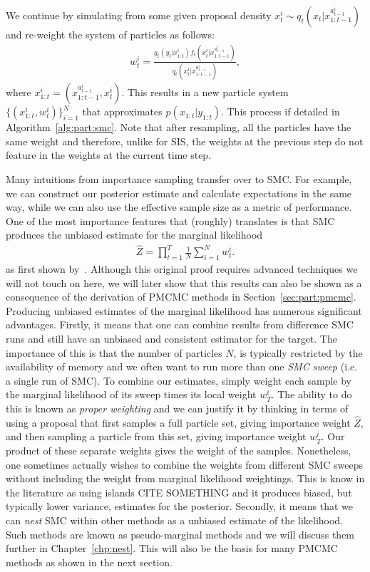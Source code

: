 We continue by simulating from some given proposal density $x_t^i \sim q_t(x_t | x_{1:t-1}^{a_{t-1}^i})$ and 
re-weight the system of particles as follows:
\begin{align}
\label{eq:smcweights}
w_t^i = \frac{g_t(y_t|x_{1:t}^i) f_t(x_t^i | x_{1:t-1}^{a_{t-1}^i})}{q_t(x_t^i|x_{1:t-1}^{a_{t-1}^i})},
\end{align}
where $x_{1:t}^i = (x_{1:t-1}^{a_{t-1}^i},x_t^i)$. This results in a new particle system $\{(x_{1:t}^i,w_t^i)\}_{i=1}^N$ that approximates $p(x_{1:t}|y_{1:t})$. This process if detailed in Algorithm~\ref{alg:part:smc}.  Note that after resampling,
all the particles have the same weight and therefore, unlike for SIS, the weights at the previous step
do not feature in the weights at the current time step.

Many intuitions from importance sampling transfer over to SMC.  For example, we can construct our posterior
estimate and calculate expectations in the same way, while we can also use the effective sample size as
a metric of performance.  One of the most importance features that (roughly) translates is that SMC produces the
unbiased estimate for the marginal likelihood 
\begin{align}
\label{eq:part:ML}
\hat Z = \prod_{t=1}^T \frac{1}{N} \sum_{i=1}^N w_{t}^{i}.
\end{align}
as first shown by~\cite{del2004feynman}.  Although this original
proof requires advanced techniques we will not touch on here, we will later show that this results can also be shown
as a consequence of the derivation of PMCMC methods in Section~\ref{sec:part:pmcmc}.  Producing unbiased
estimates of the marginal likelihood has numerous significant advantages.  Firstly, it means that one can combine
results from difference SMC runs and still have an unbiased and consistent estimator for the target.  
The importance of this is that the number of particles $N$, is typically restricted by the availability of memory
and we often want to run more than one \emph{SMC sweep} (i.e. a single run of SMC).
To combine our estimates,
simply weight each sample by the marginal likelihood of its sweep times
its local weight $w_T^i$.  The ability to do this is known as \emph{proper weighting} and we can justify it by
thinking in terms of using a proposal that first samples a full particle set, giving importance weight $\hat Z$, and then sampling a particle
from this set, giving importance weight $w_T^i$.  Our product of these separate weights gives the weight of
the samples.  Nonetheless, one sometimes actually wishes to combine the weights from different SMC sweeps
without including the weight from marginal likelihood weightings.  This is know in the literature as using
islands CITE SOMETHING and it produces biased, but typically lower variance, estimates for the posterior.
Secondly, it means that we can \emph{nest} SMC within other methods as a unbiased estimate of the likelihood.
Such methods are known as pseudo-marginal methods and we will discuss them further in Chapter~\ref{chp:nest}.
This will also be the basis for many PMCMC methods as shown in the next section.

